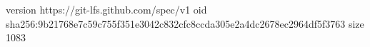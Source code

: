 version https://git-lfs.github.com/spec/v1
oid sha256:9b21768e7c59c755f351e3042c832cfc8ccda305e2a4dc2678ec2964df5f3763
size 1083
